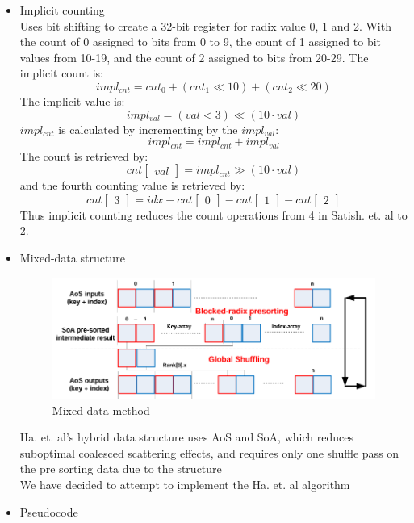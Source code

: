 \documentclass{article}
\begin{document}
\begin{itemize}
\item Implicit counting \\
Uses bit shifting to create a 32-bit register for radix value 0, 1 and 2. With the count of 0 assigned to bits from 0 to 9, the count of 1 assigned to bit values from 10-19, and the count of 2 assigned to bits from 20-29. The implicit count is: $$impl_{cnt} = cnt_0 + (cnt_1 \ll 10) + (cnt_2 \ll 20)$$
The implicit value is: 
$$impl_{val} = (val \lt  3) \ll (10 \cdot val)$$
$impl_{cnt}$ is calculated by incrementing by the $impl_{val}$:
$$impl_{cnt} = impl_{cnt} + impl_{val}$$
The count is retrieved by: 
$$cnt\begin{bmatrix}val\end{bmatrix} = impl_{cnt} \gg (10 \cdot val) $$
and the fourth counting value is retrieved by:
$$cnt\begin{bmatrix} 3 \end{bmatrix} = idx - cnt\begin{bmatrix} 0 \end{bmatrix} - cnt\begin{bmatrix} 1 \end{bmatrix} - cnt\begin{bmatrix} 2 \end{bmatrix}$$
Thus implicit counting reduces the count operations from 4 in Satish. et. al to 2. 
\item Mixed-data structure \\

\begin{figure} [H]
    \centering
    \includegraphics[width=\linewidth]{images/mixed-data.PNG}
    \caption{Mixed data method \citep{ha2010implicit}}
    \label{fig:enter-label}
\end{figure}
Ha. et. al's hybrid data structure uses AoS and SoA, which reduces suboptimal coalesced scattering effects, and requires only one shuffle pass on the pre sorting data due to the structure  
\\
We have decided to attempt to implement the Ha. et. al algorithm
\item Pseudocode



\end{itemize}
\end{document}

